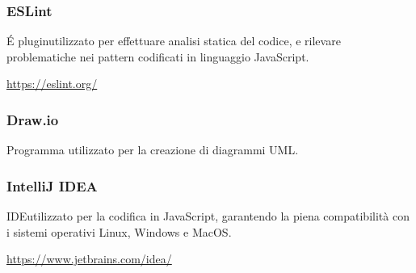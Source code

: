 	\subsubsection{ESLint}
	\'E plugin\glo utilizzato per effettuare analisi statica del codice, e rilevare problematiche nei pattern codificati in linguaggio JavaScript\glo. \\
	\centerline{\url{https://eslint.org/}}
	\subsubsection{Draw.io}
	Programma utilizzato per la creazione di diagrammi UML.
	\subsubsection{IntelliJ IDEA}
	IDE\glo utilizzato per la codifica in JavaScript, garantendo la piena compatibilità con i sistemi operativi Linux, Windows e MacOS.\\		
	\centerline{\url{https://www.jetbrains.com/idea/}}
